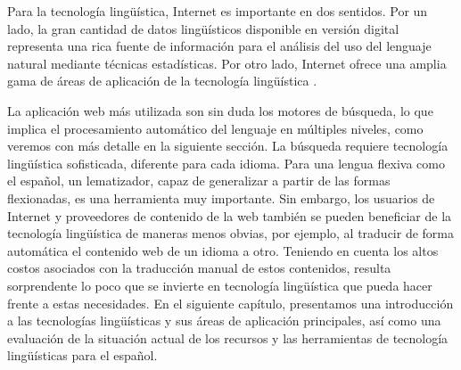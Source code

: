 \begin{multicols}{2}
Para la tecnología lingüística, Internet es importante en dos sentidos. Por un lado, la gran cantidad de datos lingüísticos disponible en versión digital representa una rica fuente de información para el análisis del uso del lenguaje natural mediante técnicas estadísticas. Por otro lado, Internet ofrece una amplia gama de áreas de aplicación de la tecnología lingüística \cite{lenguatec}.

La aplicación web más utilizada son sin duda los motores de búsqueda, lo que implica el procesamiento automático del lenguaje en múltiples niveles, como veremos con más detalle en la siguiente sección. La búsqueda requiere tecnología lingüística sofisticada, diferente para cada idioma. Para una lengua flexiva como el español, un lematizador, capaz de generalizar a partir de las formas flexionadas, es una herramienta muy importante. Sin embargo, los usuarios de Internet y proveedores de contenido de la web también se pueden beneficiar de la tecnología lingüística de maneras menos obvias, por ejemplo, al traducir de forma automática el contenido web de un idioma a otro. Teniendo en cuenta los altos costos asociados con la traducción manual de estos contenidos, resulta sorprendente lo poco que se invierte en tecnología lingüística que pueda hacer frente a estas necesidades. En el siguiente capítulo, presentamos una introducción a las tecnologías lingüísticas y sus áreas de aplicación principales, así como una evaluación de la situación actual de los recursos y las herramientas de tecnología lingüísticas para el español.

\end{multicols}

\clearpage



